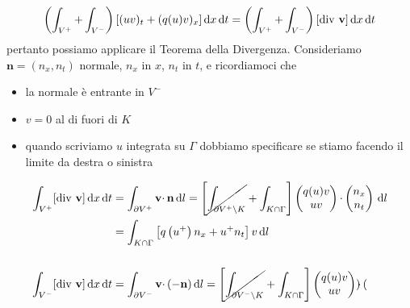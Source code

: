 \begin{dimostrazione}
\begin{gather*}
        \left(\int _{V^{+}} +\int _{V^{-}}\right)[(uv)_{t} +(q(u) v)_{x}] \dx\dt=\left(\int _{V^{+}} +\int _{V^{-}}\right)[\mathrm{div} \ \mathbf{v}] \dx\dt
    \end{gather*}
    pertanto possiamo applicare il Teorema della Divergenza. Consideriamo $\mathbf{n} =(n_{x} ,n_{t})$ normale, $n_{x}$ in $x$, $n_{t}$ in $t$, e ricordiamoci che
    \begin{itemize}
        \item la normale è entrante in $V^{-}$
        \item $v=0$ al di fuori di $K$
        \item quando scriviamo $u$ integrata su $\Gamma $ dobbiamo specificare se stiamo facendo il limite da destra o sinistra
    \end{itemize}
    \begin{align*}
        \int _{V^{+}}[\mathrm{div} \ \mathbf{v}] \,\mathrm d x\,\mathrm d t & =\int _{\partial V^{+}}\mathbf{v} \cdotp \mathbf{n} \,\mathrm d l=\left[\cancel{\int _{\partial V^{+} \setminus K}} +\int _{K\cap \Gamma }\right]
        \begin{pmatrix}
            q(u) v \\
            uv
        \end{pmatrix} \cdotp
        \begin{pmatrix}
            n_{x} \\
            n_{t}
        \end{pmatrix} \,\mathrm d l                                                                                                                                                              \\
                                                        & =\int _{K\cap \Gamma }\left[ q\left(u^{+}\right) n_{x} +u^{+} n_{t}\right] v\,\mathrm d l                                                            \\
                                                        &                                                                                                                                            \\
        \int _{V^{-}}[\mathrm{div} \ \mathbf{v}] \,\mathrm d x\,\mathrm d t & =\int _{\partial V^{-}}\mathbf{v} \cdotp (-\mathbf{n}) \,\mathrm d l=\left[\cancel{\int _{\partial V^{-} \setminus K}} +\int _{K\cap \Gamma }\right]
        \begin{pmatrix}
            q(u) v \\
            uv
        \end{pmatrix} \cdotp
        \begin{pmatrix}

\end{pmatrix}
\end{align*}
\end{dimostrazione}
